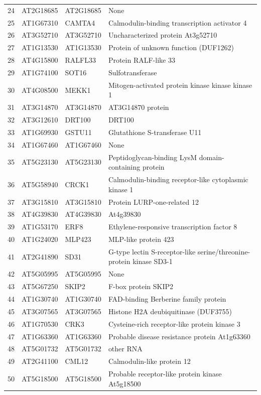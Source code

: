 \documentclass[11pt]{article}
\begin{document}
\begin{center}
\begin{tabular}{rlll}
24 & AT2G18685 & AT2G18685 & None\\
25 & AT1G67310 & CAMTA4 & Calmodulin-binding transcription activator 4\\
26 & AT3G52710 & AT3G52710 & Uncharacterized protein At3g52710\\
27 & AT1G13530 & AT1G13530 & Protein of unknown function (DUF1262)\\
28 & AT4G15800 & RALFL33 & Protein RALF-like 33\\
29 & AT1G74100 & SOT16 & Sulfotransferase\\
30 & AT4G08500 & MEKK1 & Mitogen-activated protein kinase kinase kinase 1\\
31 & AT3G14870 & AT3G14870 & AT3G14870 protein\\
32 & AT3G12610 & DRT100 & DRT100\\
33 & AT1G69930 & GSTU11 & Glutathione S-transferase U11\\
34 & AT1G67460 & AT1G67460 & None\\
35 & AT5G23130 & AT5G23130 & Peptidoglycan-binding LysM domain-containing protein\\
36 & AT5G58940 & CRCK1 & Calmodulin-binding receptor-like cytoplasmic kinase 1\\
37 & AT3G15810 & AT3G15810 & Protein LURP-one-related 12\\
38 & AT4G39830 & AT4G39830 & At4g39830\\
39 & AT1G53170 & ERF8 & Ethylene-responsive transcription factor 8\\
40 & AT1G24020 & MLP423 & MLP-like protein 423\\
41 & AT2G41890 & SD31 & G-type lectin S-receptor-like serine/threonine-protein kinase SD3-1\\
42 & AT5G05995 & AT5G05995 & None\\
43 & AT5G67250 & SKIP2 & F-box protein SKIP2\\
44 & AT1G30740 & AT1G30740 & FAD-binding Berberine family protein\\
45 & AT3G07565 & AT3G07565 & Histone H2A deubiquitinase (DUF3755)\\
46 & AT1G70530 & CRK3 & Cysteine-rich receptor-like protein kinase 3\\
47 & AT1G63360 & AT1G63360 & Probable disease resistance protein At1g63360\\
48 & AT5G01732 & AT5G01732 & other RNA\\
49 & AT2G41100 & CML12 & Calmodulin-like protein 12\\
50 & AT5G18500 & AT5G18500 & Probable receptor-like protein kinase At5g18500\\

\end{tabular}
\end{center}
\end{document}
